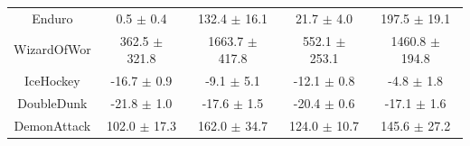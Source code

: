 \begin{table}[h]
\begin{tabular}{ccccc}
Enduro        &        0.5 $\pm$ 0.4 &     132.4 $\pm$ 16.1 &      21.7 $\pm$ 4.0 &      197.5 $\pm$ 19.1 \\
WizardOfWor   &    362.5 $\pm$ 321.8 &   1663.7 $\pm$ 417.8 &   552.1 $\pm$ 253.1 &    1460.8 $\pm$ 194.8 \\
IceHockey     &      -16.7 $\pm$ 0.9 &       -9.1 $\pm$ 5.1 &     -12.1 $\pm$ 0.8 &        -4.8 $\pm$ 1.8 \\
DoubleDunk    &      -21.8 $\pm$ 1.0 &      -17.6 $\pm$ 1.5 &     -20.4 $\pm$ 0.6 &       -17.1 $\pm$ 1.6 \\
DemonAttack   &     102.0 $\pm$ 17.3 &     162.0 $\pm$ 34.7 &    124.0 $\pm$ 10.7 &      145.6 $\pm$ 27.2 \\
\bottomrule
\end{tabular}
\end{table}

